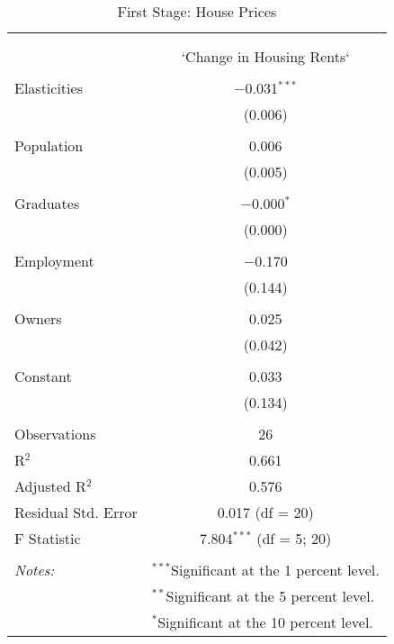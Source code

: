 
\begin{table}[!htbp] \centering 
  \caption{First Stage: House Prices} 
  \label{} 
\begin{tabular}{@{\extracolsep{5pt}}lc} 
\\[-1.8ex]\hline 
\hline \\[-1.8ex] 
\\[-1.8ex] & `Change in Housing Rents` \\ 
\hline \\[-1.8ex] 
 Elasticities & $-$0.031$^{***}$ \\ 
  & (0.006) \\ 
  & \\ 
 Population & 0.006 \\ 
  & (0.005) \\ 
  & \\ 
 Graduates & $-$0.000$^{*}$ \\ 
  & (0.000) \\ 
  & \\ 
 Employment & $-$0.170 \\ 
  & (0.144) \\ 
  & \\ 
 Owners & 0.025 \\ 
  & (0.042) \\ 
  & \\ 
 Constant & 0.033 \\ 
  & (0.134) \\ 
  & \\ 
Observations & 26 \\ 
R$^{2}$ & 0.661 \\ 
Adjusted R$^{2}$ & 0.576 \\ 
Residual Std. Error & 0.017 (df = 20) \\ 
F Statistic & 7.804$^{***}$ (df = 5; 20) \\ 
\hline \\[-1.8ex] 
\textit{Notes:} & \multicolumn{1}{l}{$^{***}$Significant at the 1 percent level.} \\ 
 & \multicolumn{1}{l}{$^{**}$Significant at the 5 percent level.} \\ 
 & \multicolumn{1}{l}{$^{*}$Significant at the 10 percent level.} \\ 
\end{tabular} 
\end{table} 
